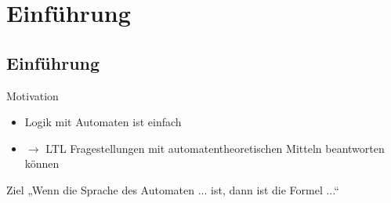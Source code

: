 \section{Einführung}
\subsection{Einführung}
\begin{frame}{\insertsubsection}
    \begin{block}{Motivation}
    \begin{itemize}[<+->]
        \item Logik mit Automaten ist einfach
        \item $\rightarrow$ LTL Fragestellungen mit automatentheoretischen Mitteln beantworten können
    \end{itemize}
    \end{block}
    \pause
    \begin{block}{Ziel}
        „Wenn die Sprache des Automaten ... ist, dann ist die Formel ...“
    \end{block}
\end{frame}